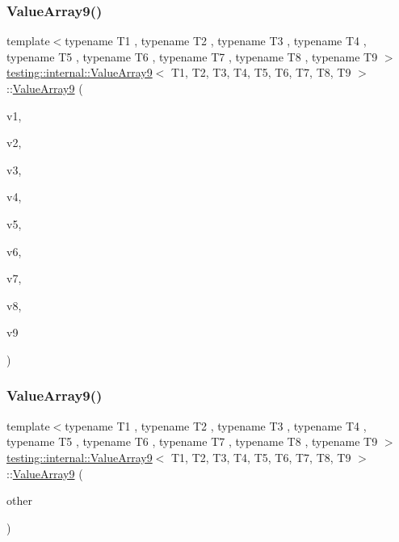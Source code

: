 \subsubsection{\texorpdfstring{ValueArray9()}{ValueArray9()}\hspace{0.1cm}{\footnotesize\ttfamily [1/2]}}
{\footnotesize\ttfamily template$<$typename T1 , typename T2 , typename T3 , typename T4 , typename T5 , typename T6 , typename T7 , typename T8 , typename T9 $>$ \\
\mbox{\hyperlink{classtesting_1_1internal_1_1_value_array9}{testing\+::internal\+::\+Value\+Array9}}$<$ T1, T2, T3, T4, T5, T6, T7, T8, T9 $>$\+::\mbox{\hyperlink{classtesting_1_1internal_1_1_value_array9}{Value\+Array9}} (\begin{DoxyParamCaption}\item[{T1}]{v1,  }\item[{T2}]{v2,  }\item[{T3}]{v3,  }\item[{T4}]{v4,  }\item[{T5}]{v5,  }\item[{T6}]{v6,  }\item[{T7}]{v7,  }\item[{T8}]{v8,  }\item[{T9}]{v9 }\end{DoxyParamCaption})\hspace{0.3cm}{\ttfamily [inline]}}

\mbox{\label{classtesting_1_1internal_1_1_value_array9_ab251d9c7a0df5c8034ecda38eadd030a}} 
\subsubsection{\texorpdfstring{ValueArray9()}{ValueArray9()}\hspace{0.1cm}{\footnotesize\ttfamily [2/2]}}
{\footnotesize\ttfamily template$<$typename T1 , typename T2 , typename T3 , typename T4 , typename T5 , typename T6 , typename T7 , typename T8 , typename T9 $>$ \\
\mbox{\hyperlink{classtesting_1_1internal_1_1_value_array9}{testing\+::internal\+::\+Value\+Array9}}$<$ T1, T2, T3, T4, T5, T6, T7, T8, T9 $>$\+::\mbox{\hyperlink{classtesting_1_1internal_1_1_value_array9}{Value\+Array9}} (\begin{DoxyParamCaption}\item[{const \mbox{\hyperlink{classtesting_1_1internal_1_1_value_array9}{Value\+Array9}}$<$ T1, T2, T3, T4, T5, T6, T7, T8, T9 $>$ \&}]{other }\end{DoxyParamCaption})\hspace{0.3cm}{\ttfamily [inline]}}



